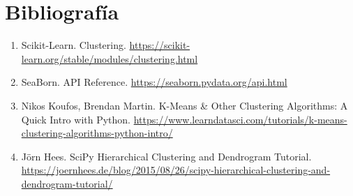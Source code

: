 \documentclass{article}
\begin{document}
\section{Bibliografía}

\begin{enumerate}
\item Scikit-Learn. Clustering. \url{https://scikit-learn.org/stable/modules/clustering.html}
\item SeaBorn. API Reference. \url{https://seaborn.pydata.org/api.html}
\item Nikos Koufos, Brendan Martin. K-Means \& Other Clustering Algorithms: A Quick Intro with Python. \url{https://www.learndatasci.com/tutorials/k-means-clustering-algorithms-python-intro/}
\item Jörn Hees. SciPy Hierarchical Clustering and Dendrogram Tutorial. \url{https://joernhees.de/blog/2015/08/26/scipy-hierarchical-clustering-and-dendrogram-tutorial/}
\end{enumerate}
\end{document}
